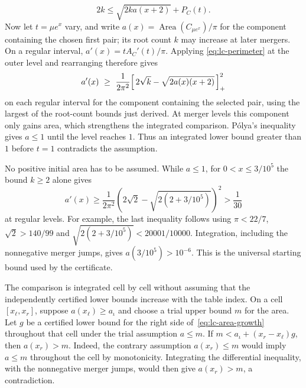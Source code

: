 \[
 2k\le\sqrt{2ka(x+2)}+P_C(t).
\]
Now let $t=\mu e^x$ vary, and write
$a(x)=\operatorname{Area}(C_{\mu e^x})/\pi$ for the component containing
the chosen first pair; its root count $k$ may increase at later mergers.
On a regular interval, $a'(x)=tA_C'(t)/\pi$. Applying
\eqref{eq:lc-perimeter} at the outer level and rearranging therefore gives
\begin{equation}\label{eq:lc-area-growth}
 a'(x)\ \ge\ \frac1{2\pi^2}
 \Bigl[\,2\sqrt k-\sqrt{2a(x)(x+2)}\,\Bigr]_{+}^{2}
\end{equation}
on each regular interval for the component containing the selected pair,
using the largest of the root-count bounds just derived. At merger levels
this component only gains
area, which strengthens the integrated comparison. P\'olya's inequality
gives $a\le1$ until the level reaches $1$. Thus an integrated lower bound
greater than $1$ before $t=1$ contradicts the assumption.

No positive initial area has to be assumed. While $a\le1$, for
$0<x\le3/10^5$ the bound $k\ge2$ alone gives
\[
 a'(x)\ge\frac1{2\pi^2}
 \left(2\sqrt2-\sqrt{2(2+3/10^5)}\right)^2>\frac1{30}
\]
at regular levels. For example, the last inequality follows using
$\pi<22/7$, $\sqrt2>140/99$ and
$\sqrt{2(2+3/10^5)}<20001/10000$. Integration, including the
nonnegative merger jumps, gives $a(3/10^5)>10^{-6}$. This is the
universal starting bound used by the certificate.

The comparison is integrated cell by cell without assuming that the
independently certified lower bounds increase with the table index.
On a cell $[x_\ell,x_r]$, suppose $a(x_\ell)\ge a_\iota$ and choose
a trial upper bound $m$ for the area. Let $g$ be a certified lower bound
for the right side of~\eqref{eq:lc-area-growth} throughout that cell
under the trial assumption $a\le m$. If
$m<a_\iota+(x_r-x_\ell)g$, then $a(x_r)>m$. Indeed, the contrary
assumption $a(x_r)\le m$ would imply $a\le m$ throughout the cell by
monotonicity. Integrating the differential inequality, with the
nonnegative merger jumps, would then give $a(x_r)>m$, a contradiction.

